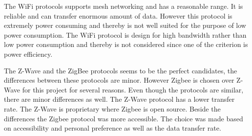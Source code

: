 The WiFi protocols supports mesh networking and has a reasonable range. It is reliable and can transfer enormous amount of data. However this protocol is extremely power consuming and thereby is not well suited for the purpose of low power consumption. The WiFi protocol is design for high bandwidth rather than low power consumption and thereby is not considered since one of the criterion is power efficiency.  


The Z-Wave and the ZigBee protocols seems to be the perfect candidates, the differences between these protocols are minor. However Zigbee is chosen over Z-Wave for this project for several reasons. Even though the protocols are similar, there are minor differences as well. The Z-Wave protocol has a lower transfer rate. The Z-Wave is proprietary where Zigbee is open source. Beside the differences the Zigbee protocol was more accessible. The choice was made based on accessibility and personal preference as well as the data transfer rate.
